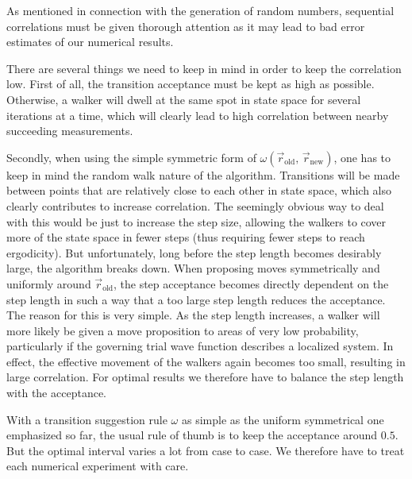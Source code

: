 As mentioned in connection with the generation of random numbers, sequential correlations must be
given thorough attention as it may lead to bad error estimates of our
numerical results.

There are several things we need to keep in mind in order to keep the
correlation low. First of all, the transition acceptance must be kept
as high as possible. Otherwise, a walker will dwell at the same spot
in state space for several iterations at a time, which will clearly
lead to high correlation between nearby succeeding measurements.

Secondly, when using the simple symmetric form of $\omega(\vec
r_\textrm{old}\textrm{, }\vec r_\textrm{new})$, one has to keep in
mind the random walk nature of the algorithm. Transitions will be made
between points that are relatively close to each other in state space,
which also clearly contributes to increase correlation. The
seemingly obvious way to deal with this would be just to
increase the step size, allowing the walkers to cover more of the
state space in fewer steps (thus requiring fewer steps to reach
ergodicity). But unfortunately, long before the step length becomes
desirably large, the algorithm breaks down. When proposing moves
symmetrically and uniformly around $\vec r_\textrm{old}$, the step
acceptance becomes directly dependent on the step length in such a way
that a too large step length reduces the acceptance. The reason for
this is very simple. As the step length increases, a walker will more
likely be given a move proposition to areas of very low probability,
particularly if the governing trial wave function describes a
localized system. In effect, the effective movement of the
walkers again becomes too small, resulting in large correlation. For
optimal results we therefore have to balance the step length with the
acceptance.

With a transition suggestion rule $\omega$ as simple as the uniform
symmetrical one emphasized so far, the usual rule of thumb is to keep
the acceptance around $0.5$. But the optimal interval varies a
lot from case to case. We therefore have to treat each numerical
experiment with care.

